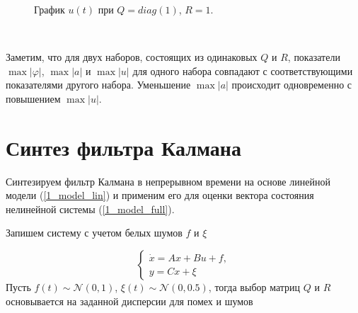 \begin{figure}[!h]
	\caption{График $u(t)$ при $Q=diag(1)$, $R=1$.}
	\label{6_2_Q_1_R_1_u}
\end{figure}


\newpage
\,
\newpage
\,
\newpage
\,
\newpage
\,
\newpage
\,
\newpage

Заметим, что для двух наборов, состоящих из одинаковых $Q$ и $R$, показатели $\max |\varphi|$, $\max |a|$ и $\max |u|$ для одного набора совпадают с соответствующими показателями другого набора. Уменьшение $\max |a|$ происходит одновременно с повышением $\max |u|$.

\section{Синтез фильтра Калмана}
Синтезируем фильтр Калмана в непрерывном времени на основе линейной модели (\ref{1_model_lin}) и применим его для оценки вектора состояния нелинейной системы (\ref{1_model_full}).

Запишем систему с учетом белых шумов $f$ и $\xi$

\begin{equation}
	\begin{cases}
		\dot{x} = Ax + Bu + f,\\
		y = Cx + \xi
	\end{cases}
\end{equation}
Пусть $f(t) \sim \mathcal{N}(0,1)$, $\xi (t) \sim \mathcal{N}(0,0.5)$, тогда выбор матриц $Q$ и $R$ основывается на заданной дисперсии для помех и шумов

